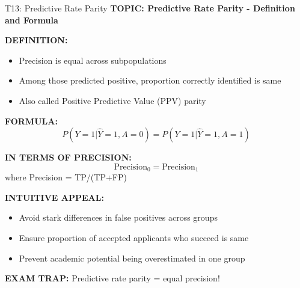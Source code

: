\documentclass[8pt]{beamer}
\begin{document}
	\begin{frame}{T13: Predictive Rate Parity}
		\fontsize{6.5}{7.5}\selectfont
		\textbf{TOPIC: Predictive Rate Parity - Definition and Formula}
		
		\vspace{0.1cm}
		\textbf{DEFINITION:}
		\begin{itemize}
			\item Precision is equal across subpopulations
			\item Among those predicted positive, proportion correctly identified is same
			\item Also called Positive Predictive Value (PPV) parity
		\end{itemize}
		
		\vspace{0.1cm}
		\textbf{FORMULA:}
		\[
		P(Y=1|\hat{Y}=1,A=0) = P(Y=1|\hat{Y}=1,A=1)
		\]
		
		\vspace{0.1cm}
		\textbf{IN TERMS OF PRECISION:}
		\[
		\text{Precision}_0 = \text{Precision}_1
		\]
		where Precision = TP/(TP+FP)
		
		\vspace{0.1cm}
		\textbf{INTUITIVE APPEAL:}
		\begin{itemize}
			\item Avoid stark differences in false positives across groups
			\item Ensure proportion of accepted applicants who succeed is same
			\item Prevent academic potential being overestimated in one group
		\end{itemize}
		
		\textcolor{myred}{\textbf{EXAM TRAP:}} Predictive rate parity = \textcolor{myblue}{equal precision}!
	\end{frame}
	
\end{document}
